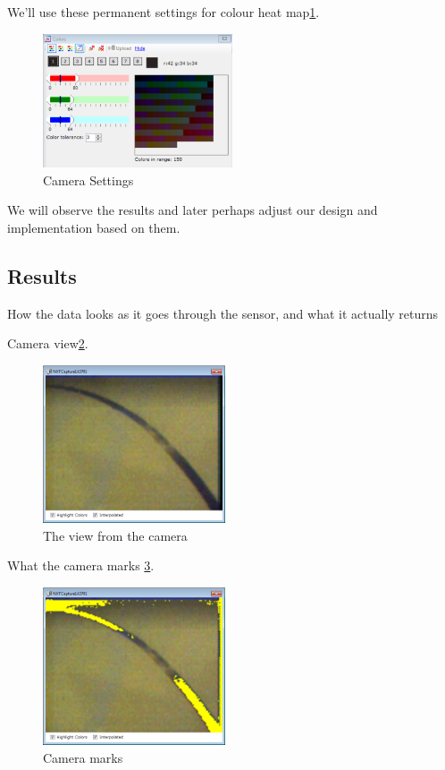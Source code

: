 We'll use these permanent settings for colour heat map\ref{fig:CamSettings}.
\begin{figure}[H]
    \centering
    \includegraphics[width=0.5\textwidth]{Images/Analysis/NXTCamTesting/NXTCamView_ColourSettings.png}
    \caption{Camera Settings}
    \label{fig:CamSettings}
\end{figure}



We will observe the results and later perhaps adjust our design and implementation based on them.

\subsection{Results}

How the data looks as it goes through the sensor, and what it actually returns



Camera view\ref{fig:CammeraView}.
\begin{figure}[H]
    \centering
    \includegraphics[width=0.48\textwidth]{Images/Analysis/NXTCamTesting/NXTCamView_Picture_NoHighlight.png}
    \caption{The view from the camera}
    \label{fig:CammeraView}
\end{figure}


What the camera marks \ref{fig:CammeraMarking}.
\begin{figure}[H]
    \centering
    \includegraphics[width=0.48\textwidth]{Images/Analysis/NXTCamTesting/NXTCamView_Picture_Highlight.png}
    \caption{Camera marks}
    \label{fig:CammeraMarking}
\end{figure}

